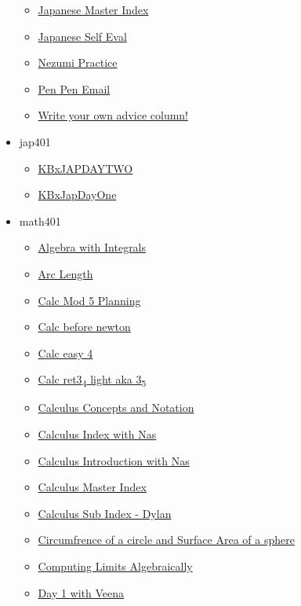 \documentclass[11pt]{article}
\begin{document}
\begin{itemize}
\begin{itemize}
\item \href{jap201/KBJapanese\_Master\_Index.org}{Japanese Master Index}
\item \href{jap201/KBxJapSelfEval.org}{Japanese Self Eval}
\item \href{jap201/KBNezumiPractice.org}{Nezumi Practice}
\item \href{jap201/KBxPenPalEmail.org}{Pen Pen Email}
\item \href{jap201/KBxAdviceColumn.org}{Write your own advice column!}
\end{itemize}
\item jap401
\begin{itemize}
\item \href{jap401/KBxJAPDAYTWO.org}{KBxJAPDAYTWO}
\item \href{jap401/KBxJapDayOne.org}{KBxJapDayOne}
\end{itemize}
\item math401
\begin{itemize}
\item \href{math401/KBrefIntegralAlgebra.org}{Algebra with Integrals}
\item \href{math401/KBrefArcLength.org}{Arc Length}
\item \href{math401/KBxCalcMod5.org}{Calc Mod 5 Planning}
\item \href{math401/KBe2020math401floCalcBeforeNewtonLeibniz.org}{Calc before newton}
\item \href{math401/KBe20math401retEasy4.org}{Calc easy 4}
\item \href{math401/KBe20math401ret3\_5.org}{Calc ret3\textsubscript{4} light aka 3\textsubscript{5}}
\item \href{math401/KBe2020math401refCalcConceptsNotation.org}{Calculus Concepts and Notation}
\item \href{math401/00-Topic-KB202008250914.org}{Calculus Index with Nas}
\item \href{math401/KBe2020math401flo1.org}{Calculus Introduction with Nas}
\item \href{math401/KBCalculusMasterIndex.org}{Calculus Master Index}
\item \href{math401/KBd2020math401SubIndex.org}{Calculus Sub Index - Dylan}
\item \href{math401/KBe21math401retSurfaceAreaOfSphere.org}{Circumfrence of a circle and Surface Area of a sphere}
\item \href{math401/KBMATH401ComputingLimits.org}{Computing Limits Algebraically}
\item \href{math401/KBhMATH401Day1.org}{Day 1 with Veena}

\end{itemize}
\end{itemize}
\end{document}

